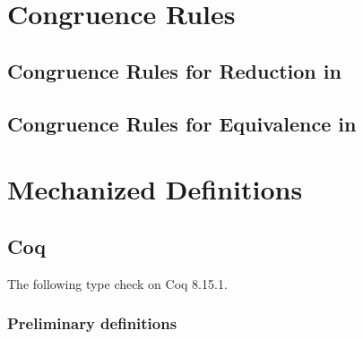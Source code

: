 \chapter{Congruence Rules} \label{app:cong}



\iffalse
The following two sections contain the full congruence rules for
the congruent closure of reduction in \lang,
and for equivalence in \CICE.
The shorthand rules \rref*{red-cong} and \rref*{equiv-cong} can then be proven
as theorems by induction on the respective congruence rules.
\fi

\section{Congruence Rules for Reduction in \lang} \label{app:cong:red}


\section{Congruence Rules for Equivalence in \CICE} \label{app:cong:equiv}


\chapter{Mechanized \CICE Definitions} \label{app:mechanization}

\setmonofont{iosevka.ttc}

\section{Coq}

The following type check on Coq 8.15.1.

\subsection{Preliminary definitions} \label{app:mechanization:coq:prelim}

